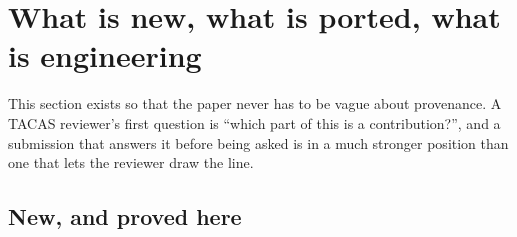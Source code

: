 \section{What is new, what is ported, what is engineering}
\label{sec:novelty}

This section exists so that the paper never has to be vague about provenance.
A TACAS reviewer's first question is ``which part of this is a contribution?'',
and a submission that answers it before being asked is in a much stronger
position than one that lets the reviewer draw the line.

\subsection{New, and proved here}

